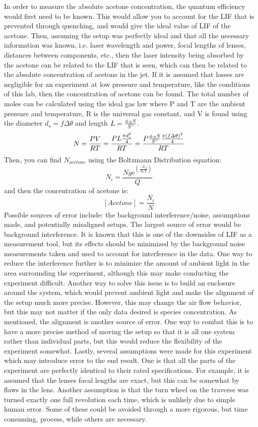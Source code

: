 \documentclass{article}
\begin{document}
\indent In order to measure the absolute acetone concentration, the quantum efficiency would first need to be known.  This would allow you to account for the LIF that is prevented through quenching, and would give the ideal value of LIF of the acetone.  Then, assuming the setup was perfectly ideal and that all the necessary information was known, i.e. laser wavelength and power, focal lengths of lenses, distances between components, etc., then the  laser intensity being absorbed by the acetone can be related to the LIF that is seen, which can then be related to the absolute concentration of acetone in the jet.  \newline
\indent If it is assumed that losses are negligible for an experiment at low pressure and temperature, like the conditions of this lab, then the concentration of acetone can be found.  The total number of moles can be calculated using the ideal gas law where P and T are the ambient pressure and temperature, R is the universal gas constant, and V is found using the diameter $d_s=f\Delta\theta$ and length $L=\frac{\phi_A S}{S"}$.
$$N=\frac{PV}{RT}=\frac{PL\frac{\pi d_s^2}{4}}{RT}=\frac{P\frac{\phi_A S}{S"}\frac{\pi (f\Delta\theta)^2}{4}}{RT}$$
Then, you can find $N_{acetone}$ using the Boltzmann Distribution equation:
$$N_i=\frac{Nge^{(\frac{-E_A}{R_uT})}}{Q}$$
and then the concentration of acetone is:
$$[Acetone]=\frac{N_i}{N}$$
\indent Possible sources of error include: the background interference/noise, assumptions made, and potentially misaligned setups.  The largest source of error would be background interference.  It is known that this is one of the downsides of LIF as a measurement tool, but its effects should be minimized by the background noise measurements taken and used to account for interference in the data.  One way to reduce the interference further is to minimize the amount of ambient light in the area surrounding the experiment, although this may make conducting the experiment difficult.  Another way to solve this issue is to build an enclosure around the system, which would prevent ambient light and make the alignment of the setup much more precise.  However, this may change the air flow behavior, but this may not matter if the only data desired is species concentration.  As mentioned, the alignment is another source of error.  One way to combat this is to have a more precise method of moving the setup so that it is all one system rather than individual parts, but this would reduce the flexibility of the experiment somewhat.  Lastly, several assumptions were made for this experiment which may introduce error to the end result.  One is that all the parts of the experiment are perfectly identical to their rated specifications.  For example, it is assumed that the lenses focal lengths are exact, but this can be somewhat by flaws in the lens.  Another assumption is that the turn wheel on the traverse was turned exactly one full revolution each time, which is unlikely due to simple human error.  Some of these could be avoided through a more rigorous, but time consuming, process, while others are necessary.
\end{document}
